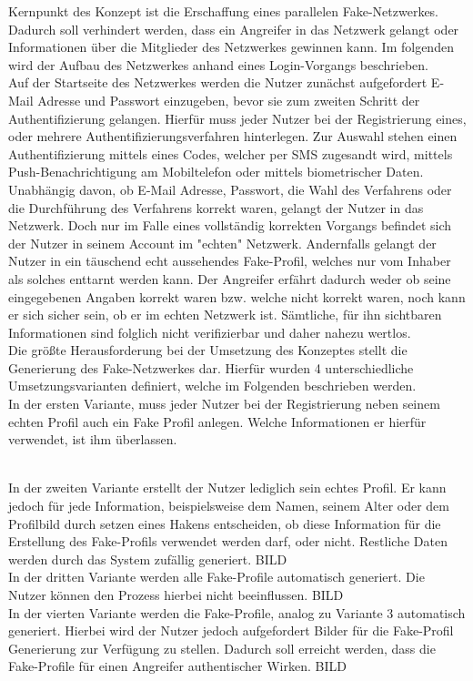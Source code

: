 \documentclass{sigchi}
\begin{document}
Kernpunkt des Konzept ist die Erschaffung eines parallelen Fake-Netzwerkes. Dadurch soll verhindert werden, dass ein Angreifer in das Netzwerk gelangt oder Informationen über die Mitglieder des Netzwerkes gewinnen kann. Im folgenden wird der Aufbau des Netzwerkes anhand eines Login-Vorgangs beschrieben. \\
Auf der Startseite des Netzwerkes werden die Nutzer zunächst aufgefordert E-Mail Adresse und Passwort einzugeben, bevor sie zum zweiten Schritt der Authentifizierung gelangen. Hierfür muss jeder Nutzer bei der Registrierung eines, oder mehrere Authentifizierungsverfahren hinterlegen. Zur Auswahl stehen einen Authentifizierung mittels eines Codes, welcher per SMS zugesandt wird, mittels Push-Benachrichtigung am Mobiltelefon oder mittels biometrischer Daten. Unabhängig davon, ob E-Mail Adresse, Passwort, die Wahl des Verfahrens oder die Durchführung des Verfahrens korrekt waren, gelangt der Nutzer in das Netzwerk. Doch nur im Falle eines vollständig korrekten Vorgangs befindet sich der Nutzer in seinem Account im "echten" Netzwerk. Andernfalls gelangt der Nutzer in ein täuschend echt aussehendes Fake-Profil, welches nur vom Inhaber als solches enttarnt werden kann. Der Angreifer erfährt dadurch weder ob seine eingegebenen Angaben korrekt waren bzw. welche nicht korrekt waren, noch kann er sich sicher sein, ob er im echten Netzwerk ist. Sämtliche, für ihn sichtbaren Informationen sind folglich nicht verifizierbar und daher nahezu wertlos. \\
Die größte Herausforderung bei der Umsetzung des Konzeptes stellt die Generierung des Fake-Netzwerkes dar. Hierfür wurden 4 unterschiedliche Umsetzungsvarianten definiert, welche im Folgenden beschrieben werden. \\
In der ersten Variante, muss jeder Nutzer bei der Registrierung neben seinem echten Profil auch ein Fake Profil anlegen. Welche Informationen er hierfür verwendet, ist ihm überlassen. 
\begin{minipage}{\columnwidth}
	\centering
	\label{fig:ASIL}
\end{minipage}
\\
In der zweiten Variante erstellt der Nutzer lediglich sein echtes Profil. Er kann jedoch für jede Information, beispielsweise dem Namen, seinem Alter oder dem Profilbild durch setzen eines Hakens entscheiden, ob diese Information für die Erstellung des Fake-Profils verwendet werden darf, oder nicht. Restliche Daten werden durch das System zufällig generiert.  BILD \\
In der dritten Variante werden alle Fake-Profile automatisch generiert. Die Nutzer können den Prozess hierbei nicht beeinflussen. BILD \\
In der vierten Variante werden die Fake-Profile, analog zu Variante 3 automatisch generiert. Hierbei wird der Nutzer jedoch aufgefordert Bilder für die Fake-Profil Generierung zur Verfügung zu stellen. Dadurch soll erreicht werden, dass die Fake-Profile für einen Angreifer authentischer Wirken. BILD \\
\end{document}
